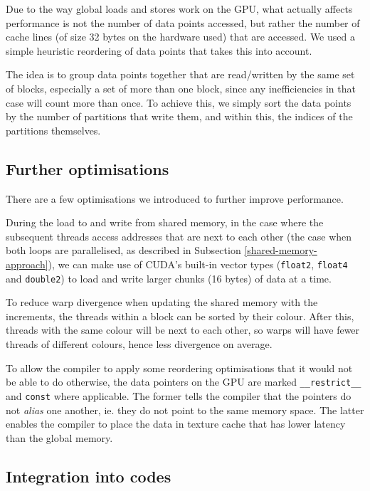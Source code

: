 Due to the way global loads and stores work on the GPU, what actually affects
performance is not the number of data points accessed, but rather the number of
cache lines (of size 32 bytes on the hardware used) that are accessed. We used a simple heuristic
reordering of data points that takes this into account.

The idea is to group data points together that are read/written by the same set
of blocks, especially a set of more than one block, since any inefficiencies in
that case will count more than once. To achieve this, we simply sort the data
points by the number of partitions that write them, and within this, the indices
of the partitions themselves.

\subsection{Further optimisations}\label{optimisations}

There are a few optimisations we introduced to further improve performance.

During the load to and write from shared memory, in the case where the
subsequent threads access addresses that are next to each other (the case when
both loops are parallelised, as described in Subsection
\ref{shared-memory-approach}), we can make use of CUDA's built-in vector
types (\lstinline!float2!, \lstinline!float4! and \lstinline!double2!) to load
and write larger chunks (16 bytes) of data at a time.

To reduce warp divergence when updating the shared memory with the increments,
the threads within a block can be sorted by their colour. After this, threads
with the same colour will be next to each other, so warps will have fewer threads
of different colours, hence less divergence on average.

To allow the compiler to apply some reordering optimisations that it would not be
able to do otherwise, the data pointers on the GPU are marked
\lstinline!__restrict__! and \lstinline!const! where applicable. The former
tells the compiler that the pointers do not \emph{alias} one another, ie. they
do not point to the same memory space. The latter enables the compiler to place
the data in texture cache that has lower latency than the global memory.

\subsection{Integration into codes}

